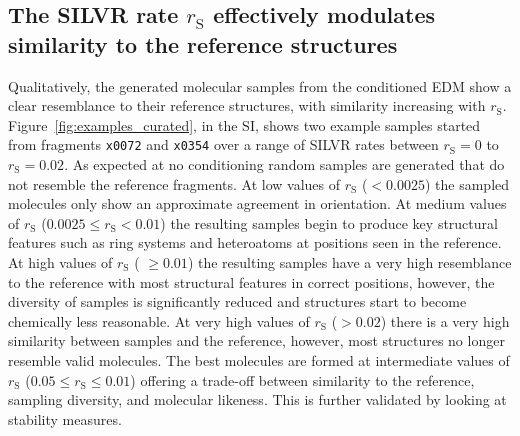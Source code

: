 \documentclass[journal=jacsat,manuscript=article]{achemso}
\begin{document}
\subsection{The SILVR rate $r_{\mathrm{S}}$ effectively modulates similarity to the reference structures}
Qualitatively, the generated molecular samples from the conditioned EDM  show a clear resemblance to their reference structures, with similarity increasing with $r_{\mathrm{S}}$. Figure~\ref{fig:examples_curated}, in the SI, shows two example samples started from fragments \texttt{x0072} and \texttt{x0354} over a range of SILVR rates between $r_{\mathrm{S}}=0$ to $r_{\mathrm{S}}=0.02$. As expected at no conditioning random samples are generated that do not resemble the reference fragments.  At low values of $r_{\mathrm{S}}$ ($< 0.0025$) the sampled molecules only show an approximate agreement in orientation. At medium values of $r_{\mathrm{S}}$ ($0.0025 \le r_{\mathrm{S}} < 0.01$) the resulting samples begin to produce key structural features such as ring systems and heteroatoms at positions seen in the reference. At high values of $r_{\mathrm{S}}$ ( $\ge 0.01$) the resulting samples have a very high resemblance to the reference with most structural features in correct positions, however, the diversity of samples is significantly reduced and structures start to become chemically less reasonable. At very high values of $r_{\mathrm{S}}$ ($> 0.02$) there is a very high similarity between samples and the reference, however, most structures no longer resemble valid molecules. The best molecules are formed at intermediate values of $r_{\mathrm{S}}$ ($0.05 \le r_{\mathrm{S}} \le 0.01$) offering a trade-off between similarity to the reference, sampling diversity, and molecular likeness. This is further validated by looking at stability measures. 
\end{document}
